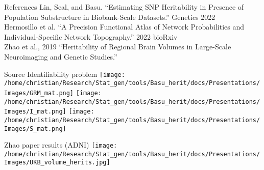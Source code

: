 \documentclass[
  ignorenonframetext,
]{beamer}
\begin{document}
\begin{frame}{References}
Lin, Seal, and Basu. “Estimating SNP Heritability in Presence of Population Substructure in Biobank-Scale Datasets.” Genetics 2022 \\
Hermosillo et al. “A Precision Functional Atlas of Network Probabilities and Individual-Specific Network Topography.” 2022 bioRxiv \\
Zhao et al., 2019 “Heritability of Regional Brain Volumes in Large-Scale Neuroimaging and Genetic Studies.”
\end{frame}


\begin{frame}{Source Identifiability problem}
\centering
\texttt{[image: /home/christian/Research/Stat\_gen/tools/Basu\_herit/docs/Presentations/Images/GRM\_mat.png]}
\texttt{[image: /home/christian/Research/Stat\_gen/tools/Basu\_herit/docs/Presentations/Images/I\_mat.png]}
\texttt{[image: /home/christian/Research/Stat\_gen/tools/Basu\_herit/docs/Presentations/Images/S\_mat.png]}
\end{frame}

\begin{frame}{Zhao paper results (ADNI)}
\centering
\texttt{[image: /home/christian/Research/Stat\_gen/tools/Basu\_herit/docs/Presentations/Images/UKB\_volume\_herits.jpg]}


\end{frame}
\end{document}
